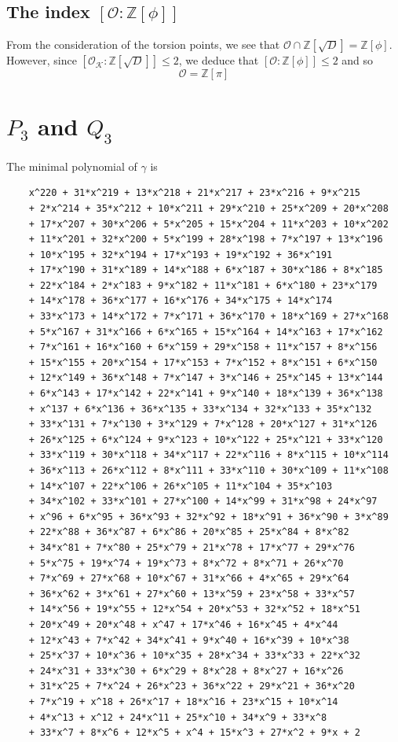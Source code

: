 \documentclass{scrartcl}
\newcommand{\Z}{\mathbb{Z}}
\newcommand{\K}{\mathcal{K}}
\renewcommand{\O}{\mathcal{O}}
\theoremstyle{definition}
\begin{document}
\subsection*{The index $[\O : \Z[\phi]]$}
From the consideration of the torsion points, we see that $\O \cap \Z[\sqrt{D}] = \Z[\phi]$.
However, since $[\O_\K : \Z[\sqrt{D}]] \leq 2$, we deduce that $[\O : \Z[\phi]] \leq 2$ and so
\begin{equation*}
    \O = \Z[\pi]
\end{equation*}

\section{$P_3$ and $Q_3$}
\label{sec:numerical_values}
The minimal polynomial of $\gamma$ is
\begin{lstlisting}
    x^220 + 31*x^219 + 13*x^218 + 21*x^217 + 23*x^216 + 9*x^215 
    + 2*x^214 + 35*x^212 + 10*x^211 + 29*x^210 + 25*x^209 + 20*x^208 
    + 17*x^207 + 30*x^206 + 5*x^205 + 15*x^204 + 11*x^203 + 10*x^202 
    + 11*x^201 + 32*x^200 + 5*x^199 + 28*x^198 + 7*x^197 + 13*x^196 
    + 10*x^195 + 32*x^194 + 17*x^193 + 19*x^192 + 36*x^191 
    + 17*x^190 + 31*x^189 + 14*x^188 + 6*x^187 + 30*x^186 + 8*x^185 
    + 22*x^184 + 2*x^183 + 9*x^182 + 11*x^181 + 6*x^180 + 23*x^179 
    + 14*x^178 + 36*x^177 + 16*x^176 + 34*x^175 + 14*x^174 
    + 33*x^173 + 14*x^172 + 7*x^171 + 36*x^170 + 18*x^169 + 27*x^168 
    + 5*x^167 + 31*x^166 + 6*x^165 + 15*x^164 + 14*x^163 + 17*x^162 
    + 7*x^161 + 16*x^160 + 6*x^159 + 29*x^158 + 11*x^157 + 8*x^156 
    + 15*x^155 + 20*x^154 + 17*x^153 + 7*x^152 + 8*x^151 + 6*x^150 
    + 12*x^149 + 36*x^148 + 7*x^147 + 3*x^146 + 25*x^145 + 13*x^144 
    + 6*x^143 + 17*x^142 + 22*x^141 + 9*x^140 + 18*x^139 + 36*x^138 
    + x^137 + 6*x^136 + 36*x^135 + 33*x^134 + 32*x^133 + 35*x^132 
    + 33*x^131 + 7*x^130 + 3*x^129 + 7*x^128 + 20*x^127 + 31*x^126 
    + 26*x^125 + 6*x^124 + 9*x^123 + 10*x^122 + 25*x^121 + 33*x^120 
    + 33*x^119 + 30*x^118 + 34*x^117 + 22*x^116 + 8*x^115 + 10*x^114 
    + 36*x^113 + 26*x^112 + 8*x^111 + 33*x^110 + 30*x^109 + 11*x^108 
    + 14*x^107 + 22*x^106 + 26*x^105 + 11*x^104 + 35*x^103 
    + 34*x^102 + 33*x^101 + 27*x^100 + 14*x^99 + 31*x^98 + 24*x^97 
    + x^96 + 6*x^95 + 36*x^93 + 32*x^92 + 18*x^91 + 36*x^90 + 3*x^89 
    + 22*x^88 + 36*x^87 + 6*x^86 + 20*x^85 + 25*x^84 + 8*x^82 
    + 34*x^81 + 7*x^80 + 25*x^79 + 21*x^78 + 17*x^77 + 29*x^76 
    + 5*x^75 + 19*x^74 + 19*x^73 + 8*x^72 + 8*x^71 + 26*x^70 
    + 7*x^69 + 27*x^68 + 10*x^67 + 31*x^66 + 4*x^65 + 29*x^64 
    + 36*x^62 + 3*x^61 + 27*x^60 + 13*x^59 + 23*x^58 + 33*x^57 
    + 14*x^56 + 19*x^55 + 12*x^54 + 20*x^53 + 32*x^52 + 18*x^51 
    + 20*x^49 + 20*x^48 + x^47 + 17*x^46 + 16*x^45 + 4*x^44 
    + 12*x^43 + 7*x^42 + 34*x^41 + 9*x^40 + 16*x^39 + 10*x^38 
    + 25*x^37 + 10*x^36 + 10*x^35 + 28*x^34 + 33*x^33 + 22*x^32 
    + 24*x^31 + 33*x^30 + 6*x^29 + 8*x^28 + 8*x^27 + 16*x^26 
    + 31*x^25 + 7*x^24 + 26*x^23 + 36*x^22 + 29*x^21 + 36*x^20 
    + 7*x^19 + x^18 + 26*x^17 + 18*x^16 + 23*x^15 + 10*x^14 
    + 4*x^13 + x^12 + 24*x^11 + 25*x^10 + 34*x^9 + 33*x^8 
    + 33*x^7 + 8*x^6 + 12*x^5 + x^4 + 15*x^3 + 27*x^2 + 9*x + 2
\end{lstlisting}
\end{document}
